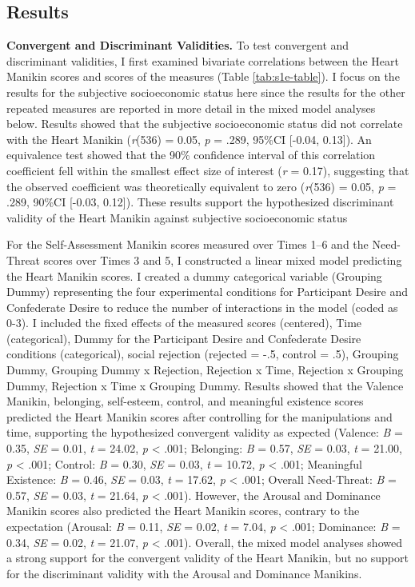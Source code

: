 \documentclass[
]{udthesis}
\begin{document}
\subsection{Results}\label{results-4}

\textbf{Convergent and Discriminant Validities.} To test convergent and
discriminant validities, I first examined bivariate correlations between
the Heart Manikin scores and scores of the measures (Table
\ref{tab:s1e-table}). I focus on the results for the subjective
socioeconomic status here since the results for the other repeated
measures are reported in more detail in the mixed model analyses below.
Results showed that the subjective
socioeconomic status did not correlate with the Heart
Manikin (\emph{r}(536) = 0.05, \emph{p} = .289, 95\%CI {[}-0.04, 0.13{]}). An equivalence test
showed that the 90\% confidence interval of this correlation coefficient
fell within the smallest effect size of interest (\textbar{}\emph{r}\textbar{} = 0.17), suggesting that the
observed coefficient was theoretically equivalent to zero
(\emph{r}(536) = 0.05, \emph{p} = .289, 90\%CI {[}-0.03, 0.12{]}). These results support the
hypothesized discriminant validity of the Heart Manikin against
subjective socioeconomic status

For the Self-Assessment Manikin scores measured over Times 1--6 and the
Need-Threat scores over Times 3 and 5, I constructed a linear mixed
model predicting the Heart Manikin scores. I created a dummy categorical
variable (Grouping Dummy) representing the four experimental conditions
for Participant Desire and Confederate Desire to reduce the number of
interactions in the model (coded as 0-3). I included the fixed effects
of the measured scores (centered), Time (categorical), Dummy for the
Participant Desire and Confederate Desire conditions (categorical),
social rejection (rejected = -.5, control = .5), Grouping Dummy,
Grouping Dummy x Rejection, Rejection x Time, Rejection x Grouping
Dummy, Rejection x Time x Grouping Dummy. Results showed that the
Valence Manikin, belonging, self-esteem, control, and meaningful
existence scores predicted the Heart Manikin scores after controlling
for the manipulations and time, supporting the hypothesized convergent
validity as expected (Valence: \emph{B} = 0.35, \emph{SE} = 0.01, \emph{t} = 24.02, \emph{p} \textless{} .001; Belonging:
\emph{B} = 0.57, \emph{SE} = 0.03, \emph{t} = 21.00, \emph{p} \textless{} .001; Control:
\emph{B} = 0.30, \emph{SE} = 0.03, \emph{t} = 10.72, \emph{p} \textless{} .001; Meaningful Existence:
\emph{B} = 0.46, \emph{SE} = 0.03, \emph{t} = 17.62, \emph{p} \textless{} .001; Overall Need-Threat:
\emph{B} = 0.57, \emph{SE} = 0.03, \emph{t} = 21.64, \emph{p} \textless{} .001). However, the Arousal and Dominance Manikin
scores also predicted the Heart Manikin scores, contrary to the
expectation (Arousal: \emph{B} = 0.11, \emph{SE} = 0.02, \emph{t} = 7.04, \emph{p} \textless{} .001; Dominance:
\emph{B} = 0.34, \emph{SE} = 0.02, \emph{t} = 21.07, \emph{p} \textless{} .001). Overall, the mixed model analyses showed a
strong support for the convergent validity of the Heart Manikin, but no
support for the discriminant validity with the Arousal and Dominance
Manikins.
\end{document}
